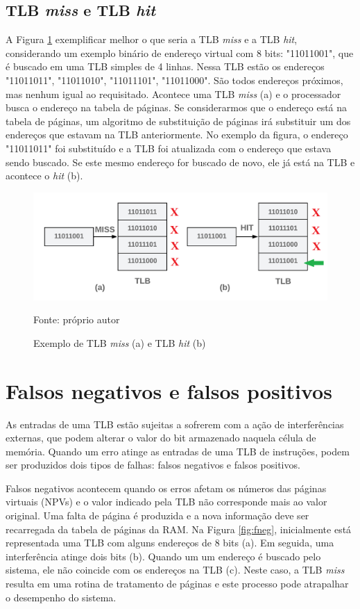 \subsection{TLB \textit{miss} e TLB \textit{hit}}

A Figura \ref{fig:hit&miss} exemplificar melhor o que seria a TLB \textit{miss} e a TLB \textit{hit}, considerando um exemplo binário de endereço virtual com 8 bits: "11011001", que é buscado em uma TLB simples de 4 linhas. Nessa TLB estão os endereços "11011011", "11011010", "11011101", "11011000". São todos endereços próximos, mas nenhum igual ao requisitado. Acontece uma TLB \textit{miss} (a) e o processador busca o endereço na tabela de páginas. Se considerarmos que o endereço está na tabela de páginas, um algoritmo de substituição de páginas irá substituir um dos endereços que estavam na TLB anteriormente. No exemplo da figura, o endereço "11011011" foi substituído e a TLB foi atualizada com o endereço que estava sendo buscado. Se este mesmo endereço for buscado de novo, ele já está na TLB e acontece o \textit{hit} (b).

\begin{figure}[ht]
    \centering
      \includegraphics[scale=0.3]{figuras/hit&miss.png}
    \caption{Exemplo de TLB \textit{miss} (a) e TLB \textit{hit} (b)}{Fonte: próprio autor}
    \label{fig:hit&miss}
\end{figure}



\section{Falsos negativos e falsos positivos}

As entradas de uma TLB estão sujeitas a sofrerem com a ação de interferências externas, que podem alterar o valor do bit armazenado naquela célula de memória. Quando um erro atinge as entradas de uma TLB de instruções, podem ser produzidos dois tipos de falhas: falsos negativos e falsos positivos.

Falsos negativos acontecem quando os erros afetam os números das páginas
virtuais (NPVs) e o valor indicado pela TLB não corresponde mais ao valor original. Uma
falta de página é produzida e a nova informação deve ser recarregada da tabela de páginas da RAM. Na Figura \ref{fig:fneg}, inicialmente está representada uma TLB com alguns endereços de 8 bits (a). Em seguida, uma interferência atinge dois bits (b). Quando um um endereço é buscado pelo sistema, ele não coincide com os endereços na TLB (c). Neste caso, a TLB \textit{miss} resulta em uma rotina de tratamento de páginas e este processo pode atrapalhar o desempenho do sistema.


